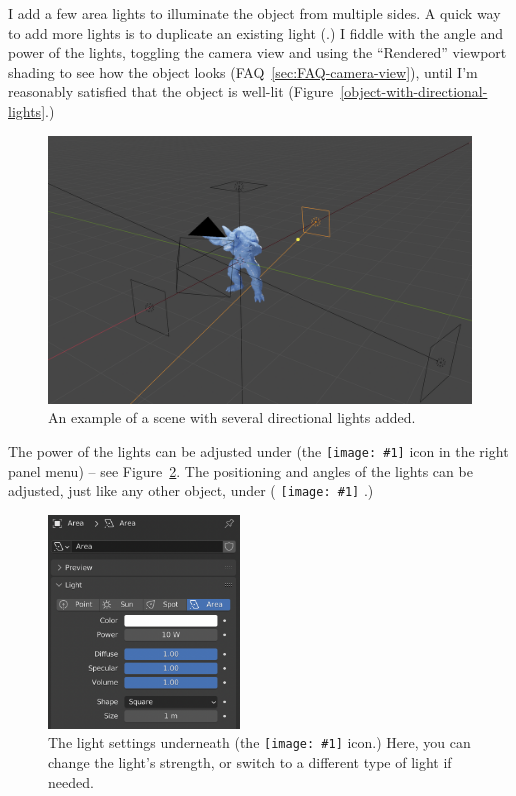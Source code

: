 \documentclass[10pt]{article}
\DeclareRobustCommand{\inlinepic}[1]{%
  \begingroup\normalfont
  \texttt{[image: \#1]}%
  \endgroup
}
\begin{document}
I add a few area lights to illuminate the object from multiple sides. A quick way to add more lights is to duplicate an existing light (.) I fiddle with the angle and power of the lights, toggling the camera view and using the ``Rendered'' viewport shading to see how the object looks (FAQ~\ref{sec:FAQ-camera-view}), until I'm reasonably satisfied that the object is well-lit (Figure~\ref{object-with-directional-lights}.) 
\begin{figure}[H]
    \centering
    \captionsetup{width=0.8\textwidth}
    \includegraphics[width=5in]{images/object-with-directional-lights.png}
    \caption{An example of a scene with several directional lights added.}
    \label{fig:object-with-directional-lights}
\end{figure}

The power of the lights can be adjusted under  (the \inlinepic{images/object-data-properties-light.png} icon in the right panel menu) -- see Figure~\ref{fig:area-light-settings}. The positioning and angles of the lights can be adjusted, just like any other object, under  (\inlinepic{images/object-properties.png}.)

\begin{figure}[H]
    \centering
    \captionsetup{width=0.8\textwidth}
    \includegraphics[width=2in]{images/area-light-settings.png}
    \caption{The light settings underneath  (the \inlinepic{images/object-data-properties-light.png} icon.) Here, you can change the light's strength, or switch to a different type of light if needed. \label{fig:area-light-settings}}
\end{figure}
\end{document}
